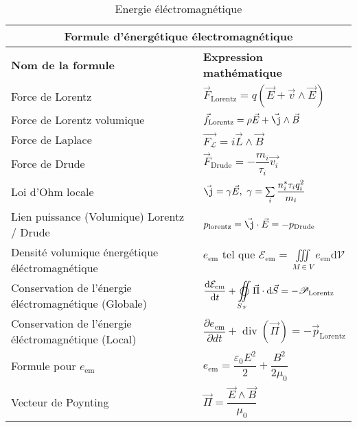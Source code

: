 \documentclass[10pt,a4paper,titlepage,portrait]{article}
\renewcommand{\d}
{
    \mathrm{d}
}
\newcommand*{\dv}[2]
{
    \dfrac{\d#1}{\d#2}
}
\newcommand*{\dpv}[2]
{
    \dfrac{\partial#1}{\partial#2}
}
\renewcommand{\div}
{
    \operatorname{div}
}
\renewcommand{\arraystretch}{2}
\begin{document}
\begin{table}[H]
    \centering
    \renewcommand{\arraystretch}{1.5} %
    \setlength{\tabcolsep}{8pt} %
    \begin{tabular}{@{}p{9cm}p{10cm}@{}}
        \toprule
        \multicolumn{2}{c}{\textbf{Formule d'énergétique électromagnétique}} \\
        \midrule
        \textbf{Nom de la formule} & \textbf{Expression mathématique} \\
        \midrule
    Force de Lorentz & $\vec{F}_{\text{Lorentz}} = q \left(\vec{E} + \vec{v} \wedge \vec{E}\right)$ \\ 
    Force de Lorentz volumique & $\vec{{f}}_{\text{Lorentz}} = \rho \vec{E} + \vec{\j}\wedge \vec{B}$ \\ 
    Force de Laplace & $\vec{F_\mathscr{L}}=i\vec{L}\wedge \vec{B}$ \\ 
    Force de Drude & $\vec{F}_{\text{Drude}} = -\dfrac{m_i}{\tau_i}\vec{v_i}$ \\ 
    Loi d'Ohm locale & $\vec{\j} = \gamma \vec{E}, \ \gamma = \sum\limits_{i}\dfrac{n_i^{*}\tau_i q_i^2}{m_i}$ \\ 
    Lien puissance (Volumique) Lorentz / Drude & $p_{\text{lorentz}} = \vec{\j}\cdot\vec{E} = -p_{\text{Drude}}$ \\ 
    Densité volumique énergétique éléctromagnétique & $\displaystyle e_{\text{em}} \text{ tel que } \mathcal{E}_{\text{em}} = \iiint\limits_{M\in V}e_{\text{em}} \text{d}\mathscr{V}$ \\ 
    Conservation de l'énergie éléctromagnétique (Globale) & $\displaystyle\dv{\mathcal{E}_{\text{em}}}{t} + \varoiint\limits_{S_{\mathscr{V}}} \vec{\Pi} \cdot \text{d} \vec{S} = -\mathscr{P}_{\text{Lorentz}}$ \\ 
    Conservation de l'énergie éléctromagnétique (Local) & $\displaystyle \dpv{e_{\text{em}}}{dt} + \div(\vec{\Pi}) = - \vec{p}_{\text{Lorentz}}$ \\ 
    Formule pour $e_{\text{em}}$ & $e_{\text{em}} = \dfrac{\varepsilon_0E^2}{2} + \dfrac{B^2}{2\mu_0}$ \\ 
    Vecteur de Poynting & $\vec{\Pi} = \dfrac{\vec{E} \wedge \vec{B}}{\mu_0}$ \\ 
    \bottomrule
\end{tabular}
\caption{Energie éléctromagnétique}
\label{tab:elec_energie}
\end{table}
\end{document}
